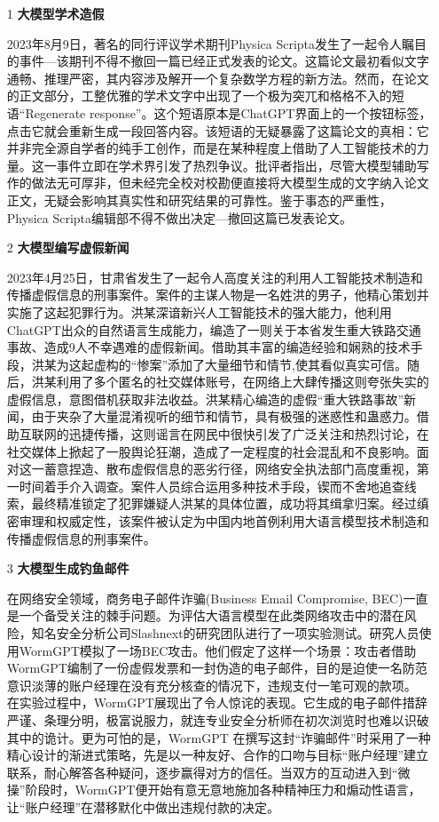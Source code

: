 \documentclass[a4paper]{report}
\begin{document}
\begin{itemize}
	\item[1] \textbf{大模型学术造假}\par
		2023年8月9日，著名的同行评议学术期刊Physica Scripta发生了一起令人瞩目的事件---该期刊不得不撤回一篇已经正式发表的论文。这篇论文最初看似文字通畅、推理严密，其内容涉及解开一个复杂数学方程的新方法。然而，在论文的正文部分，工整优雅的学术文字中出现了一个极为突兀和格格不入的短语“Regenerate response”。这个短语原本是ChatGPT界面上的一个按钮标签，点击它就会重新生成一段回答内容。该短语的无疑暴露了这篇论文的真相：它并非完全源自学者的纯手工创作，而是在某种程度上借助了人工智能技术的力量。这一事件立即在学术界引发了热烈争议。批评者指出，尽管大模型辅助写作的做法无可厚非，但未经完全校对校勘便直接将大模型生成的文字纳入论文正文，无疑会影响其真实性和研究结果的可靠性。鉴于事态的严重性，Physica Scripta编辑部不得不做出决定---撤回这篇已发表论文。
	\item[2] \textbf{大模型编写虚假新闻}\par
		2023年4月25日，甘肃省发生了一起令人高度关注的利用人工智能技术制造和传播虚假信息的刑事案件。案件的主谋人物是一名姓洪的男子，他精心策划并实施了这起犯罪行为。洪某深谙新兴人工智能技术的强大能力，他利用ChatGPT出众的自然语言生成能力，编造了一则关于本省发生重大铁路交通事故、造成9人不幸遇难的虚假新闻。借助其丰富的编造经验和娴熟的技术手段，洪某为这起虚构的“惨案”添加了大量细节和情节,使其看似真实可信。随后，洪某利用了多个匿名的社交媒体账号，在网络上大肆传播这则夸张失实的虚假信息，意图借机获取非法收益。洪某精心编造的虚假“重大铁路事故”新闻，由于夹杂了大量混淆视听的细节和情节，具有极强的迷惑性和蛊惑力。借助互联网的迅捷传播，这则谣言在网民中很快引发了广泛关注和热烈讨论，在社交媒体上掀起了一股舆论狂潮，造成了一定程度的社会混乱和不良影响。面对这一蓄意捏造、散布虚假信息的恶劣行径，网络安全执法部门高度重视，第一时间着手介入调查。案件人员综合运用多种技术手段，锲而不舍地追查线索，最终精准锁定了犯罪嫌疑人洪某的具体位置，成功将其缉拿归案。经过缜密审理和权威定性，该案件被认定为中国内地首例利用大语言模型技术制造和传播虚假信息的刑事案件。
	\item[3] \textbf{大模型生成钓鱼邮件}\par
		在网络安全领域，商务电子邮件诈骗(Business Email Compromise, BEC)一直是一个备受关注的棘手问题。为评估大语言模型在此类网络攻击中的潜在风险，知名安全分析公司Slashnext的研究团队进行了一项实验测试。研究人员使用WormGPT模拟了一场BEC攻击。他们假定了这样一个场景：攻击者借助WormGPT编制了一份虚假发票和一封伪造的电子邮件，目的是迫使一名防范意识淡薄的账户经理在没有充分核查的情况下，违规支付一笔可观的款项。
		在实验过程中，WormGPT展现出了令人惊诧的表现。它生成的电子邮件措辞严谨、条理分明，极富说服力，就连专业安全分析师在初次浏览时也难以识破其中的诡计。更为可怕的是，WormGPT 在撰写这封“诈骗邮件”时采用了一种精心设计的渐进式策略，先是以一种友好、合作的口吻与目标“账户经理”建立联系，耐心解答各种疑问，逐步赢得对方的信任。当双方的互动进入到“微操”阶段时，WormGPT便开始有意无意地施加各种精神压力和煽动性语言，让“账户经理”在潜移默化中做出违规付款的决定。
\end{itemize}
\end{document}
